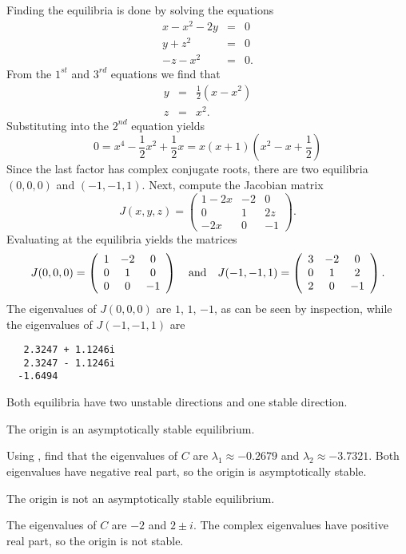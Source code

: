 \documentclass{ximera}
\begin{document}
\soln  Finding the equilibria is done by solving the equations
\begin{eqnarray*}
x - x^2 - 2y & = & 0 \\
y + z^2 & = & 0 \\
-z - x^2 & = & 0.
\end{eqnarray*}
From the $1^{st}$ and $3^{rd}$ equations we find that
\begin{eqnarray*}
 y & = & \frac{1}{2}(x-x^2)\\
 z & = & x^2.
\end{eqnarray*}
Substituting into the $2^{nd}$ equation yields
\[
 0 = x^4 - \frac{1}{2}x^2 + \frac{1}{2}x = x(x+1)(x^2-x+\frac{1}{2})
\]
Since the last factor has complex conjugate roots, there are two equilibria
$(0,0,0)$ and $(-1,-1,1)$.  Next, compute the Jacobian matrix
\[
J(x,y,z) = \left(\begin{array}{ccc}
1-2x & -2 & 0\\ 0 & 1 & 2z\\ -2x & 0 & -1 \end{array}\right).
\]
Evaluating at the equilibria yields the matrices
\[
J(0,0,0) = \left(\begin{array}{ccc}
1 & -2 & 0\\ 0 & 1 & 0\\ 0 & 0 & -1 \end{array}\right)
\quad\mbox{and}\quad 
J(-1,-1,1) = \left(\begin{array}{ccc}
3 & -2 & 0\\ 0 & 1 & 2\\ 2 & 0 & -1 \end{array}\right).
\]
The eigenvalues of $J(0,0,0)$ are $1$, $1$, $-1$, as can be seen by
inspection, while the eigenvalues of $J(-1,-1,1)$ are
\begin{verbatim}
   2.3247 + 1.1246i
   2.3247 - 1.1246i
  -1.6494     
\end{verbatim}
Both equilibria have two unstable directions and one stable direction.




\ans The origin is an asymptotically stable equilibrium.

\soln Using \Matlabp, find that the eigenvalues of $C$ are $\lambda_1
\approx -0.2679$ and $\lambda_2 \approx -3.7321$.  Both eigenvalues
have negative real part, so the origin is asymptotically stable.

\ans The origin is not an asymptotically stable equilibrium.

\soln The eigenvalues of $C$ are $-2$ and $2 \pm i$.  The complex
eigenvalues have positive real part, so the origin is not stable.
\end{document}
